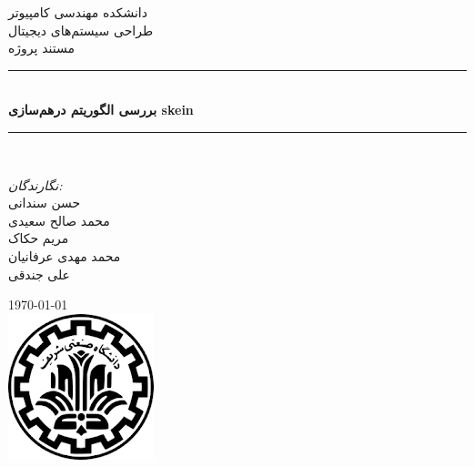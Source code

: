 \newcommand{\HRule}{\rule{\linewidth}{0.1mm}} 
\center %
 
    \textsc{\Large دانشکده مهندسی کامپیوتر}\\[0.5cm] %
    \textsc{\Large طراحی سیستم‌های دیجیتال}\\[0.5cm] %
    \textsc{\large مستند پروژه}\\[0.5cm] %

\HRule \\[0.4cm]
    { \huge \bfseries  بررسی الگوریتم درهم‌سازی skein}\\[0.1cm] %
\HRule \\[1.5cm]
 
\begin{minipage}{0.4\textwidth}
\begin{center}

 \large
    
    \emph{نگارندگان:}\\
    حسن سندانی\\
    محمد صالح سعیدی\\
    مریم حکاک\\
    محمد مهدی عرفانیان\\
    علی جندقی
    \end{center}
\end{minipage}
\vspace{10mm}

{\large \today}\\[1cm] %
\includegraphics{figs/sharif.png}%
\vfill %